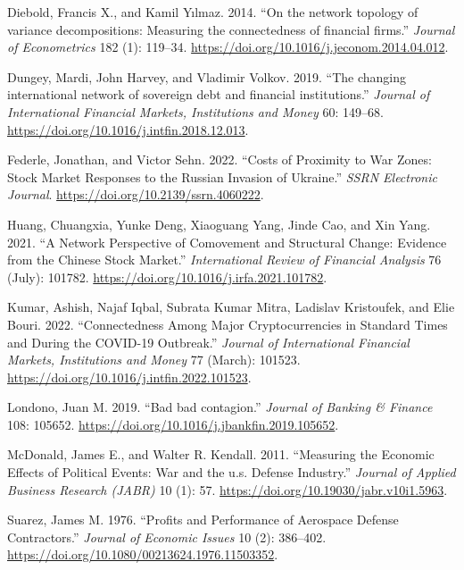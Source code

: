 \documentclass[
  letterpaper,
  DIV=11,
  numbers=noendperiod]{scrartcl}
\newlength{\cslhangindent}
\newlength{\cslentryspacingunit} %
\newenvironment{CSLReferences}[2] %
 {%
  \setlength{\parindent}{0pt}
  \ifodd #1
  \let\oldpar\par
  \def\par{\hangindent=\cslhangindent\oldpar}
  \fi
  \setlength{\parskip}{#2\cslentryspacingunit}
 }%
 {}
\begin{document}
\begin{CSLReferences}{1}{0}
\leavevmode{}%
Diebold, Francis X., and Kamil Yılmaz. 2014. {``{On the network topology
of variance decompositions: Measuring the connectedness of financial
firms}.''} \emph{Journal of Econometrics} 182 (1): 119--34.
\url{https://doi.org/10.1016/j.jeconom.2014.04.012}.

\leavevmode{}%
Dungey, Mardi, John Harvey, and Vladimir Volkov. 2019. {``{The changing
international network of sovereign debt and financial institutions}.''}
\emph{Journal of International Financial Markets, Institutions and
Money} 60: 149--68. \url{https://doi.org/10.1016/j.intfin.2018.12.013}.

\leavevmode{}%
Federle, Jonathan, and Victor Sehn. 2022. {``Costs of Proximity to War
Zones: Stock Market Responses to the Russian Invasion of Ukraine.''}
\emph{SSRN Electronic Journal}.
\url{https://doi.org/10.2139/ssrn.4060222}.

\leavevmode{}%
Huang, Chuangxia, Yunke Deng, Xiaoguang Yang, Jinde Cao, and Xin Yang.
2021. {``A Network Perspective of Comovement and Structural Change:
Evidence from the Chinese Stock Market.''} \emph{International Review of
Financial Analysis} 76 (July): 101782.
\url{https://doi.org/10.1016/j.irfa.2021.101782}.

\leavevmode{}%
Kumar, Ashish, Najaf Iqbal, Subrata Kumar Mitra, Ladislav Kristoufek,
and Elie Bouri. 2022. {``Connectedness Among Major Cryptocurrencies in
Standard Times and During the COVID-19 Outbreak.''} \emph{Journal of
International Financial Markets, Institutions and Money} 77 (March):
101523. \url{https://doi.org/10.1016/j.intfin.2022.101523}.

\leavevmode{}%
Londono, Juan M. 2019. {``{Bad bad contagion}.''} \emph{Journal of
Banking \& Finance} 108: 105652.
\url{https://doi.org/10.1016/j.jbankfin.2019.105652}.

\leavevmode{}%
McDonald, James E., and Walter R. Kendall. 2011. {``Measuring the
Economic Effects of Political Events: War and the u.s. Defense
Industry.''} \emph{Journal of Applied Business Research (JABR)} 10 (1):
57. \url{https://doi.org/10.19030/jabr.v10i1.5963}.

\leavevmode{}%
Suarez, James M. 1976. {``Profits and Performance of Aerospace Defense
Contractors.''} \emph{Journal of Economic Issues} 10 (2): 386--402.
\url{https://doi.org/10.1080/00213624.1976.11503352}.


\end{CSLReferences}
\end{document}

